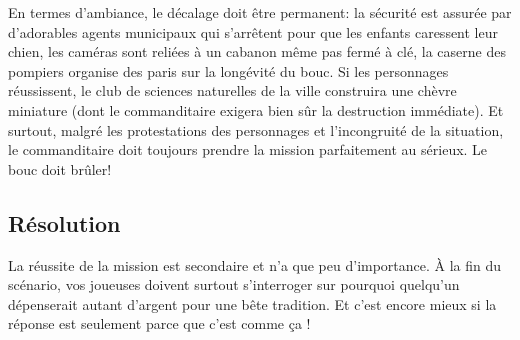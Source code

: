 En termes d'ambiance, le décalage doit être permanent: la sécurité est assurée par d'adorables agents municipaux qui s'arrêtent pour que les enfants caressent leur chien, les caméras sont reliées à un cabanon même pas fermé à clé, la caserne des pompiers organise des paris sur la longévité du bouc.
Si les personnages réussissent, le club de sciences naturelles de la ville construira une chèvre miniature (dont le commanditaire exigera bien sûr la destruction immédiate).
Et surtout, malgré les protestations des personnages et l'incongruité de la situation, le commanditaire doit toujours prendre la mission parfaitement au sérieux. Le bouc doit brûler!

\subsection{Résolution}

La réussite de la mission est secondaire et n'a que peu d'importance.
À la fin du scénario, vos joueuses doivent surtout s'interroger sur \og pourquoi \fg quelqu'un dépenserait autant d'argent pour une bête tradition.
Et c'est encore mieux si la réponse est seulement \og parce que c'est comme ça \fg!
